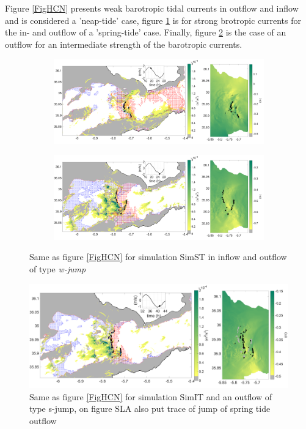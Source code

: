 Figure \ref{FigHCN} presents weak barotropic tidal currents in outflow and inflow and is considered a 'neap-tide' case, figure \ref{FigHCS} is for strong brotropic currents for the in- and outflow of a 'spring-tide' case. Finally, figure \ref{FigHCI} is the case of an outflow for an intermediate strength of the barotropic currents.

\begin{figure}[!h]
 \centering
\begin{subfigure}{\linewidth}
\centering
\includegraphics[width=\linewidth]{./GBR3D/VE2_19h30_p.png}
\end{subfigure}

\begin{subfigure}{\linewidth}
\centering
\includegraphics[width=\linewidth]{./GBR3D/VE2_25h_p.png}
\end{subfigure}
\caption {Same as figure \ref{FigHCN} for simulation SimST in inflow and outflow of type \textit{w-jump}}
\label{FigHCS}
\end{figure}

\begin{figure}[!h]
 \centering
\includegraphics[width=\linewidth]{./GBR3D/IES_41h_p.png}
 \caption {Same as figure  \ref{FigHCN} for simulation SimIT and an outflow of type {s-jump}, on figure SLA also put trace of jump of spring tide outflow}
 \label{FigHCI}
\end{figure}

